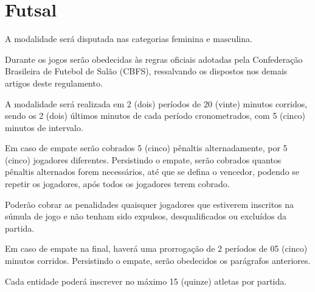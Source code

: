 {\let\clearpage\relax \chapter{Futsal}}

\begin{article}
	A modalidade será disputada nas categorias feminina e masculina.
\end{article}

\begin{article}
	Durante os jogos serão obedecidas às regras oficiais adotadas pela Confederação Brasileira de Futebol de Salão (CBFS), ressalvando os dispostos nos demais artigos deste regulamento.
\end{article}

\begin{article}
	A modalidade será realizada em 2 (dois) períodos de 20 (vinte) minutos corridos, sendo os 2 (dois) últimos minutos de cada período cronometrados, com 5 (cinco) minutos de intervalo.

	\begin{xparagraph}
		Em caso de empate serão cobrados 5 (cinco) pênaltis alternadamente, por 5 (cinco) jogadores diferentes. Persistindo o empate, serão cobrados quantos pênaltis alternados forem necessários, até que se defina o vencedor, podendo se repetir os jogadores, após todos os jogadores terem cobrado.
	\end{xparagraph}

	\begin{xparagraph}
		Poderão cobrar as penalidades quaisquer jogadores que estiverem inscritos na súmula de jogo e não tenham sido expulsos, desqualificados ou excluídos da partida.
	\end{xparagraph}

	\begin{xparagraph}
		Em caso de empate na final, haverá uma prorrogação de 2 períodos de 05 (cinco) minutos corridos. Persistindo o empate, serão obedecidos os parágrafos anteriores.
	\end{xparagraph}
\end{article}

\begin{article}
	Cada entidade poderá inscrever no máximo 15 (quinze) atletas por partida.
\end{article}
